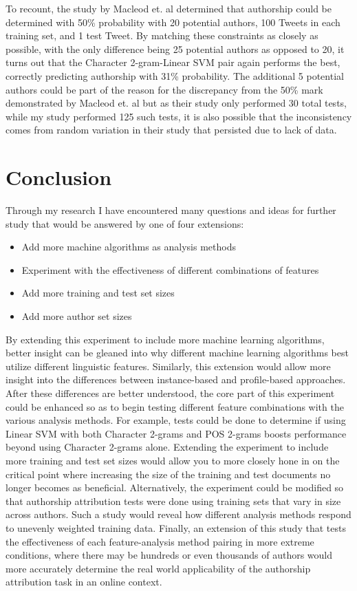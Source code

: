 \documentclass[pageno]{jpaper}
\begin{document}
To recount, the study by Macleod et. al determined that authorship could be determined with 50\% probability with 20 potential authors, 100 Tweets in each training set, and 1 test Tweet.  By matching these constraints as closely as possible, with the only difference being 25 potential authors as opposed to 20, it turns out that the Character 2-gram-Linear SVM pair again performs the best, correctly predicting authorship with 31\% probability.  The additional 5 potential authors could be part of the reason for the discrepancy from the 50\% mark demonstrated by Macleod et. al but as their study only performed 30 total tests, while my study performed 125 such tests, it is also possible that the inconsistency comes from random variation in their study that persisted due to lack of data.

\section{Conclusion}
\label{sec:conclusion}

Through my research I have encountered many questions and ideas for further study that would be answered by one of four extensions:
\begin{itemize}
\item{Add more machine algorithms as analysis methods}
\item{Experiment with the effectiveness of different combinations of features}
\item{Add more training and test set sizes}
\item{Add more author set sizes}
\end{itemize}
By extending this experiment to include more machine learning algorithms, better insight can be gleaned into why different machine learning algorithms best utilize different linguistic features.  Similarly, this extension would allow more insight into the differences between instance-based and profile-based approaches.  After these differences are better understood, the core part of this experiment could be enhanced so as to begin testing different feature combinations with the various analysis methods.  For example, tests could be done to determine if using Linear SVM with both Character 2-grams and POS 2-grams boosts performance beyond using Character 2-grams alone.
Extending the experiment to include more training and test set sizes would allow you to more closely hone in on the critical point where increasing the size of the training and test documents no longer becomes as beneficial.  Alternatively, the experiment could be modified so that authorship attribution tests were done using training sets that vary in size across authors.  Such a study would reveal how different analysis methods respond to unevenly weighted training data.  Finally, an extension of this study that tests the effectiveness of each feature-analysis method pairing in more extreme conditions, where there may be hundreds or even thousands of authors would more accurately determine the real world applicability of the authorship attribution task in an online context.
\end{document}
